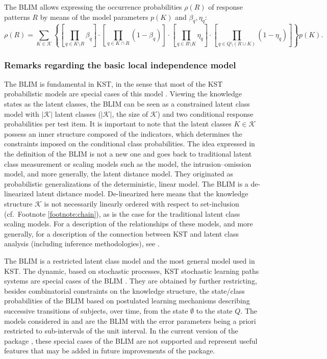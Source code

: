 \documentclass[nojss]{jss}
\begin{document}
The BLIM allows expressing the occurrence probabilities $\rho(R)$ of response patterns $R$ by means of the model parameters
$p(K)$ and $\beta_q, \eta_q$:
\[
\rho(R) = \sum_{K\in\mathcal{K}}
\left\{
\left[\prod_{q\in K\setminus R}\beta_q\right]
\cdot
\left[\prod_{q\in K\cap R}(1-\beta_q)\right] 
\cdot
\left[\prod_{q\in R\setminus K}\eta_q\right]
\cdot
\left[\prod_{q\in Q\setminus(R\cup K)} (1-\eta_q)\right]
\right\} p(K).
\]

\subsubsection{Remarks regarding the basic local independence model}

The BLIM is fundamental in KST, in the sense that most of the KST probabilistic models are 
special cases of this model \citep{DF:99}. 
Viewing the knowledge states as the latent classes, the BLIM 
can be seen as a constrained latent class model with $|\mathcal{K}|$ latent classes 
($|\mathcal{K}|$, the size of $\mathcal{K}$)
and two conditional response probabilities per test item. 
It is important to note that the latent classes $K\in \mathcal{K}$ possess an inner structure 
composed of the indicators, which determines the constraints imposed on the conditional 
class probabilities. 
The idea expressed in the definition of the BLIM is not a new one and goes back to traditional 
latent class measurement or scaling models such as the \cite{Proc:70} model, the \cite{DayMac:76} 
intrusion--omission model, and more generally, the \cite{LazHen:68} latent distance model. 
They originated as probabilistic generalizations of the deterministic, linear \cite{Guttm:44} model. 
The BLIM is a de-linearized latent distance model. De-linearized here means that the knowledge
structure $\mathcal{K}$ is not necessarily linearly ordered with respect to set-inclusion
(cf.\ Footnote \ref{footnote:chain}), as is the case for the traditional latent class scaling models. 
For a description of the relationships of these models, and more generally, for a description of 
the connection between KST and latent class analysis (including inference methodologies), 
see \cite{U:10} \citep[cf.\ also][]{S:05}.

The BLIM is a restricted latent class model and the most general model used in KST. 
The dynamic, based on stochastic processes, KST stochastic learning paths systems 
are special cases of the BLIM \citep{DF:99,F:89a, FKVDJ:90}. 
They are obtained by further restricting, besides combinatorial constraints on the knowledge structure, the state/class probabilities of the BLIM based on postulated learning mechanisms describing successive transitions of subjects, over time, from the state $\emptyset$
to the state $Q$. The models considered in \cite{S:05} and \cite{SR:09} are the BLIM with the error 
parameters being a priori restricted to sub-intervals of the unit interval. In the current version of 
the package , these special cases of the BLIM are not supported and represent 
useful features that may be added in future improvements of the package.
\end{document}
